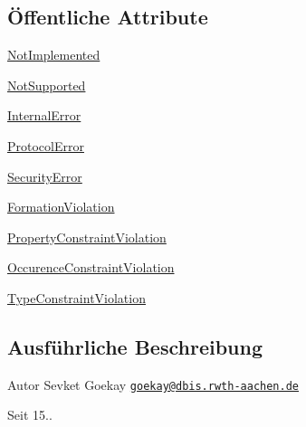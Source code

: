 \subsection*{Öffentliche Attribute}
\begin{DoxyCompactItemize}
\item 
\hyperlink{enumde_1_1rwth_1_1idsg_1_1steve_1_1ocpp_1_1ws_1_1data_1_1_error_code_a34d25307d49fa6540f6c75c3b1ed0a53}{Not\+Implemented}
\item 
\hyperlink{enumde_1_1rwth_1_1idsg_1_1steve_1_1ocpp_1_1ws_1_1data_1_1_error_code_a94565cb30049ccc41aee490a389c65b3}{Not\+Supported}
\item 
\hyperlink{enumde_1_1rwth_1_1idsg_1_1steve_1_1ocpp_1_1ws_1_1data_1_1_error_code_a348da1f31c5e2492079a52f6f27d5ef3}{Internal\+Error}
\item 
\hyperlink{enumde_1_1rwth_1_1idsg_1_1steve_1_1ocpp_1_1ws_1_1data_1_1_error_code_abd8b7dc623499609e00d9c9ac781612f}{Protocol\+Error}
\item 
\hyperlink{enumde_1_1rwth_1_1idsg_1_1steve_1_1ocpp_1_1ws_1_1data_1_1_error_code_a81dab9b92111670de061a4a61aee799d}{Security\+Error}
\item 
\hyperlink{enumde_1_1rwth_1_1idsg_1_1steve_1_1ocpp_1_1ws_1_1data_1_1_error_code_a74855f41c8bddc46b64cfde5987229c9}{Formation\+Violation}
\item 
\hyperlink{enumde_1_1rwth_1_1idsg_1_1steve_1_1ocpp_1_1ws_1_1data_1_1_error_code_a283d2b5462820bb3f4b414c83bdc5ea7}{Property\+Constraint\+Violation}
\item 
\hyperlink{enumde_1_1rwth_1_1idsg_1_1steve_1_1ocpp_1_1ws_1_1data_1_1_error_code_a18f1613d3eedcf25a2e791837290f236}{Occurence\+Constraint\+Violation}
\item 
\hyperlink{enumde_1_1rwth_1_1idsg_1_1steve_1_1ocpp_1_1ws_1_1data_1_1_error_code_a337dab1df5da78a9b46f284ec9414987}{Type\+Constraint\+Violation}
\end{DoxyCompactItemize}


\subsection{Ausführliche Beschreibung}
\begin{DoxyAuthor}{Autor}
Sevket Goekay \href{mailto:goekay@dbis.rwth-aachen.de}{\tt goekay@dbis.\+rwth-\/aachen.\+de} 
\end{DoxyAuthor}
\begin{DoxySince}{Seit}
15.. 
\end{DoxySince}


